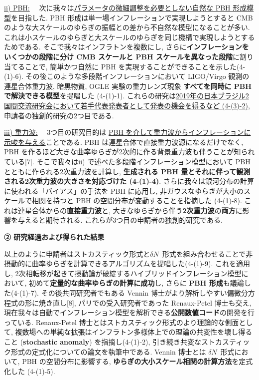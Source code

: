 \documentclass[11pt,a4paper,uplatex,twoside,dvipdfmx]{ujarticle} 	%
\renewcommand{\emph}[1]{{\sffamily\gtfamily\bfseries #1}}
\newcommand{\subsubject}[1]{\noindent \ul{#1}~~}
\newcommand{\研究課題名}{\mgfamily ストカスティック形式、原始ブラックホール、重力波観測から迫るインフレーション}
\newcommand{\研究機関名}{\mgfamily 名古屋大学}
\newcommand{\申請者氏名}{\mgfamily 多田 祐一郎}
\newcommand{\研究代表者氏名}{\申請者氏名}
\newcommand{\研究期間の最終元号年度}{34}	%
\begin{document}
{	\vspace{3pt}
	\subsubject{ii) PBH:}
	次に我々は\ul{パラメータの微細調整を必要としない自然な PBH 形成模型}を目指した.
	PBH 形成は単一場インフレーションで実現しようとすると CMB のような大スケールのゆらぎの振幅との差から不自然な模型になることが多い.
	これは小スケールのゆらぎと大スケールのゆらぎを同じ機構で実現しようとするためである.
	そこで我々はインフラトンを複数にし, さらに\emph{インフレーションをいくつかの段階に分け CMB スケールと PBH スケールを異なった段階}に割り当てることで,
	簡単かつ自然に PBH を実現することができることを示した(4-(1)-6).
	その後このような多段階インフレーションにおいて LIGO/Virgo 観測の連星合体重力波, 暗黒物質, OGLE 実験の重力レンズ現象 \emph{すべてを同時に PBH で解決できる模型}を提唱した (4-(1)-1).
	これらの研究は\ul{2019年の日本ブラジル2国間交流研究会において若手代表発表者として発表の機会を得るなど (4-(3)-2)}, 申請者の独創的研究の2つ目である.
	
	
	\vspace{3pt}
	\subsubject{iii) 重力波:}
	3つ目の研究目的は \ul{PBH を介して重力波からインフレーションに示唆を与える}ことである.
	PBH は連星合体で直接重力波源になるだけでなく, PBH を作るほど大きな曲率ゆらぎが2次的に作る背景重力波も伴うことが知られている[7].
	そこで我々はii) で述べた多段階インフレーション模型において PBH とともに作られる2次重力波を計算し,
	\emph{生成される PBH 量とそれに伴って観測される2次重力波の大きさを対応づけた (4-(1)-4)}.
	さらに我々は銀河分布の計算に使われる「バイアス」の手法を PBH に応用し, 
	非ガウスなゆらぎが大小のスケールで相関を持つと PBH の空間分布が変動することを指摘した (4-(1)-8).
	これは連星合体からの\emph{直接重力波}と, 大きなゆらぎから伴う\emph{2次重力波}の\emph{両方}に影響を与えると期待される.
	これらが3つ目の申請者の独創的研究である.

	
	
	
	\begin{mdframed}[roundcorner=0.5zw,
	innertopmargin=0.8zw,innerbottommargin=0.8zw,
	linecolor=black!50,linewidth=0.2zw,
	backgroundcolor=black!10]
	{\bfseries\gtfamily\sffamily\large ② 研究経過および得られた結果}
	\end{mdframed}
	
	\vspace{-10pt}
	以上のように申請者はストカスティック形式と$\delta N$~形式を組み合わせることで非摂動的に曲率ゆらぎを計算できるアルゴリズムを提唱した(4-(1)-9).
	これを適用し, 2次相転移が起きて摂動論が破綻するハイブリッドインフレーション模型において, 初めて\emph{定量的な曲率ゆらぎの計算に成功}し, さらに \emph{PBH 形成}も議論した(4-(1)-7).
	その後共同研究者でもある Vennin 博士がより解析しやすい偏微分方程式の形に焼き直し[8],
	パリでの受入研究者であった Renaux-Petel 博士も交え, 現在我々は自動でインフレーション模型を解析できる\emph{公開数値コード}の開発を行っている.
	Renaux-Petel 博士とはストカスティック形式のより理論的な側面として,
	複数場への単純な拡張はインフラトン多様体上での理論の共変性を壊し得ること (\emph{stochastic anomaly}) を指摘し(4-(1)-2),
	引き続き共変なストカスティック形式の定式化についての論文を執筆中である.
	Vennin 博士とは $\delta N$~形式において, PBH の空間分布に影響する, \emph{ゆらぎの大小スケール相関の計算方法}を定式化した (4-(1)-5).
	
}
\end{document}
